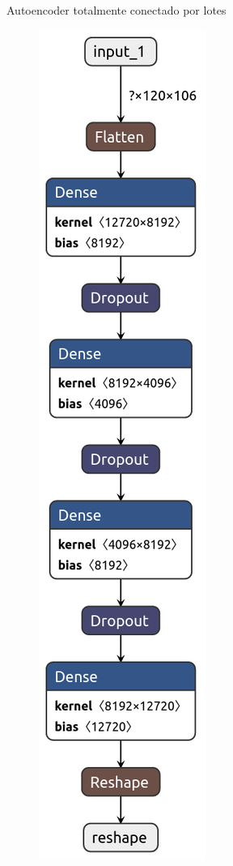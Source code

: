 \documentclass[10pt]{beamer}
\begin{document}
\begin{frame}[fragile]{Autoencoder totalmente conectado por lotes}
	\vspace{10px}
	\pause
	
	\begin{figure}[H]
		\centering
		\includegraphics[scale=0.17]{Imagenes/autoencoder-fcc-batch.png}
	\end{figure}
	
\end{frame}
\end{document}
